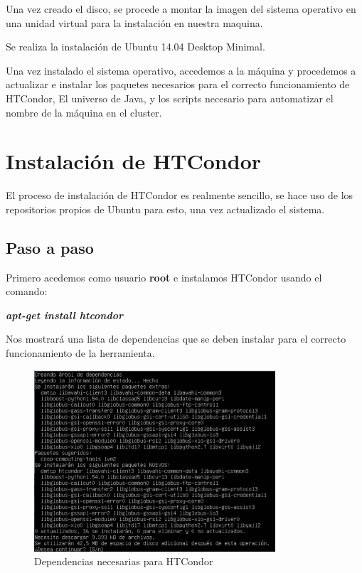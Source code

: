 Una vez creado el disco, se procede a montar la imagen del sistema operativo en una unidad virtual para la instalación en nuestra maquina.

Se realiza la instalación de Ubuntu 14.04 Desktop Minimal.

Una vez instalado el sistema operativo, accedemos a la máquina y procedemos a actualizar e instalar los paquetes necesarios para el correcto funcionamiento de HTCondor, El universo de Java, y los scripts necesario para automatizar el nombre de la máquina en el cluster.


\section{Instalación de HTCondor}
El proceso de instalación de HTCondor es realmente sencillo, se hace uso de los repositorios propios de Ubuntu para esto, una vez actualizado el sistema.

\subsection{Paso a paso}
Primero acedemos como usuario \textbf{root} e instalamos HTCondor usando el comando:

\textbf{\textit{apt-get install htcondor}}

Nos mostrará una lista de dependencias que se deben instalar para el correcto funcionamiento de la herramienta.

\begin{figure}[h]
\centering
\includegraphics[width=0.8\textwidth]{Figures/dependency.png}
\decoRule
\caption{Dependencias necesarias para HTCondor}
\label{fig:htcondor dependency}
\end{figure}
\FloatBarrier

